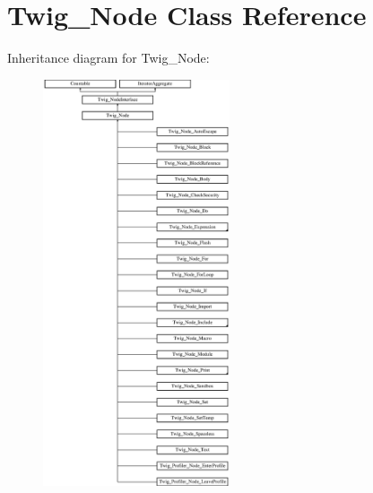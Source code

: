 \hypertarget{class_twig___node}{}\section{Twig\+\_\+\+Node Class Reference}
\label{class_twig___node}
Inheritance diagram for Twig\+\_\+\+Node\+:\begin{figure}[H]
\begin{center}
\leavevmode
\includegraphics[height=12.000000cm]{class_twig___node}
\end{center}
\end{figure}
